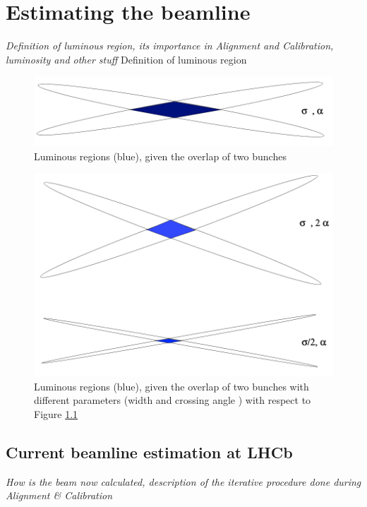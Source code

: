 \chapter{Estimating the beamline}
\textit{Definition of luminous region, its importance in Alignment and Calibration, luminosity and other stuff}
Definition of luminous region
\begin{figure}
    \centering
    \includegraphics[width=\textwidth]{figures/luminous_region.png}
    \caption{Luminous regions (blue), given the overlap of two bunches}
    \label{fig:luminous-region}
\end{figure}

\begin{figure}
    \centering
    \includegraphics[width=\textwidth]{figures/luminous_region_var.png}
    \caption{Luminous regions (blue), given the overlap of two bunches with different parameters (width \sigma and crossing angle \alpha) with respect to Figure \ref{fig:luminous-region}}
    \label{fig:luminous-region-var}
\end{figure}

\section{Current beamline estimation at LHCb}
\textit{How is the beam now calculated, description of the iterative procedure done during Alignment \& Calibration}

